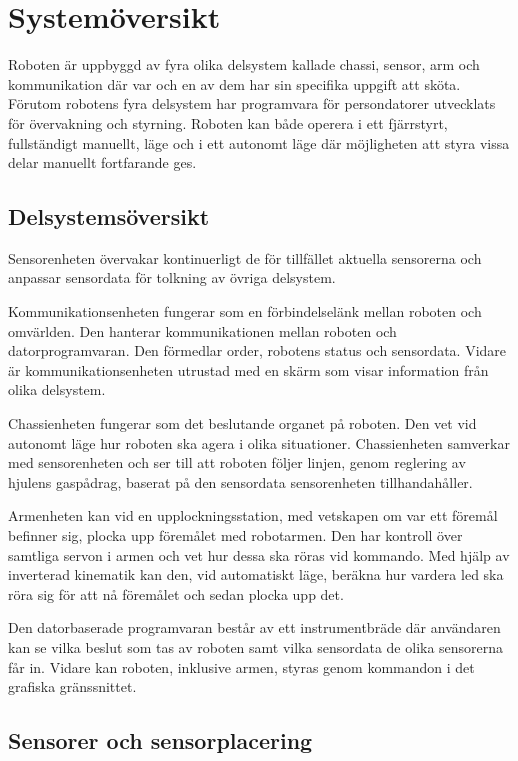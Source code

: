 \documentclass[a4paper,12pt]{article}
\begin{document}
\section{Systemöversikt}
Roboten är uppbyggd av fyra olika delsystem kallade chassi, sensor, arm och kommunikation där var och en av dem har sin specifika uppgift att sköta. Förutom robotens fyra delsystem har programvara för persondatorer utvecklats för övervakning och styrning. Roboten kan både operera i ett fjärrstyrt, fullständigt manuellt, läge och i ett autonomt läge där möjligheten att styra vissa delar manuellt fortfarande ges.

\subsection{Delsystemsöversikt}
Sensorenheten övervakar kontinuerligt de för tillfället aktuella sensorerna och anpassar sensordata för tolkning av övriga delsystem.

Kommunikationsenheten fungerar som en förbindelselänk mellan roboten och omvärlden. Den hanterar kommunikationen mellan roboten och datorprogramvaran. Den förmedlar order, robotens status och sensordata. Vidare är kommunikationsenheten utrustad med en skärm som visar information från olika delsystem.

Chassienheten fungerar som det beslutande organet på roboten. Den vet vid autonomt läge hur roboten ska agera i olika situationer. Chassienheten samverkar med sensorenheten och ser till att roboten följer linjen, genom reglering av hjulens gaspådrag, baserat på den sensordata sensorenheten tillhandahåller. 

Armenheten kan vid en upplockningsstation, med vetskapen om var ett föremål befinner sig, plocka upp föremålet med robotarmen. Den har kontroll över samtliga servon i armen och vet hur dessa ska röras vid kommando. Med hjälp av inverterad kinematik kan den, vid automatiskt läge, beräkna hur vardera led ska röra sig för att nå föremålet och sedan plocka upp det.

Den datorbaserade programvaran består av ett instrumentbräde där användaren kan se vilka beslut som tas av roboten samt vilka sensordata de olika sensorerna får in. Vidare kan roboten, inklusive armen, styras genom kommandon i det grafiska gränssnittet.

\subsection{Sensorer och sensorplacering}
\end{document}
